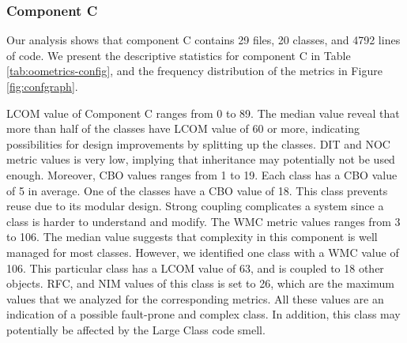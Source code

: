 \subsubsection{Component C}
Our analysis shows that component C contains 29 files, 20 classes, and 4792 lines of code. We present the descriptive statistics for component C in Table \ref{tab:oometrics-config}, and the frequency distribution of the metrics in Figure \ref{fig:confgraph}.

LCOM value of Component C ranges from 0 to 89. The median value reveal that more than half of the classes have LCOM value of 60 or more, indicating possibilities for design improvements by splitting up the classes. DIT and NOC metric values is very low, implying that inheritance may potentially not be used enough. Moreover, CBO values ranges from 1 to 19. Each class has a CBO value of 5 in average. One of the classes have a CBO value of 18. This class prevents reuse due to its modular design. Strong coupling complicates a system since a class is harder to understand and modify. The WMC metric values ranges from 3 to 106. The median value suggests that complexity in this component is well managed for most classes. However, we identified one class with a WMC value of 106. This particular class has a LCOM value of 63, and is coupled to 18 other objects. RFC, and NIM values of this class is set to 26, which are the maximum values that we analyzed for the corresponding metrics. All these values are an indication of a possible fault-prone and complex class. In addition, this class may potentially be affected by the Large Class code smell.




